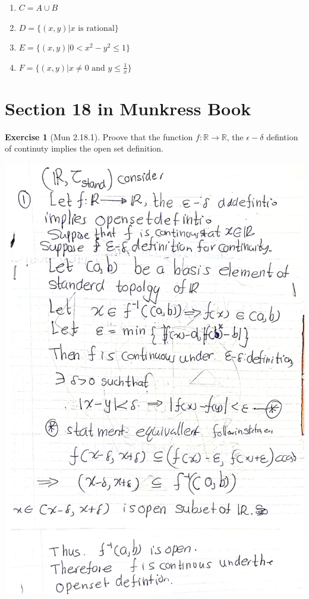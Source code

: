 \documentclass[
]{book}
\providecommand{\tightlist}{%
  \setlength{\itemsep}{0pt}\setlength{\parskip}{0pt}}
\theoremstyle{definition}
\theoremstyle{definition}
\theoremstyle{definition}
\newtheorem{exercise}{Exercise}[chapter]
\theoremstyle{definition}
\theoremstyle{remark}
\begin{document}
\begin{enumerate}
\def\labelenumi{(\alph{enumi})}
\setcounter{enumi}{2}
\tightlist
\item
  \(C = A \cup B\)
\item
  \(D = \{(x, y) | x \text{ is rational}\}\)
\item
  \(E = \{(x, y) | 0 < x^2 - y^2 \leq 1\}\)
\item
  \(F = \{(x, y) | x \neq 0 \text{ and } y \leq \frac{1}{x}\}\)
\end{enumerate}

\hypertarget{section-18-in-munkress-book}{%
\section{Section 18 in Munkress Book}\label{section-18-in-munkress-book}}

\begin{exercise}[Mun 2.18.1]
\protect\hypertarget{exr:unnamed-chunk-185}{}\label{exr:unnamed-chunk-185}Proove that the function \(f:\mathbb{R}\to\mathbb{R}\), the \(\epsilon-\delta\) defintion of continuty implies the open set definition.
\end{exercise}

\includegraphics{figures/Exercises/Ex 2.18/ex-1.png}
\end{document}
